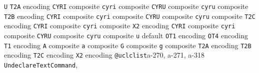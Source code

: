 \documentclass[twoside]{ltxdoc}
\makeatletter
\renewenvironment{theindex}{%
   \@restonecoltrue
   \if@twocolumn\@restonecolfalse\fi
   \columnseprule \z@
   \columnsep 35\p@
   \twocolumn[\index@prologue]%
   \IndexParms
   \let\item\@idxitem
   \ignorespaces
}{\if@restonecol\onecolumn\else\clearpage\fi}
\makeatother
\begin{document}
\begin{theindex}
  \item \texttt  {U}\efill 
    \subitem \texttt  {T2A} encoding\pfill {}
      \subsubitem \texttt  {CYRI} composite\pfill 
      \subsubitem \texttt  {cyri} composite\pfill 
      \subsubitem \texttt  {CYRU} composite\pfill 
      \subsubitem \texttt  {cyru} composite\pfill 
    \subitem \texttt  {T2B} encoding\pfill {}
      \subsubitem \texttt  {CYRI} composite\pfill 
      \subsubitem \texttt  {cyri} composite\pfill 
      \subsubitem \texttt  {CYRU} composite\pfill 
      \subsubitem \texttt  {cyru} composite\pfill 
    \subitem \texttt  {T2C} encoding\pfill {}
      \subsubitem \texttt  {CYRI} composite\pfill 
      \subsubitem \texttt  {cyri} composite\pfill 
    \subitem \texttt  {X2} encoding\pfill {}
      \subsubitem \texttt  {CYRI} composite\pfill 
      \subsubitem \texttt  {cyri} composite\pfill 
      \subsubitem \texttt  {CYRU} composite\pfill 
      \subsubitem \texttt  {cyru} composite\pfill 
  \item \texttt  {u}\efill 
    \subitem default\pfill {}
    \subitem \texttt  {OT1} encoding\pfill {}
    \subitem \texttt  {OT4} encoding\pfill {}
    \subitem \texttt  {T1} encoding\pfill {}
      \subsubitem \texttt  {A} composite\pfill {}
      \subsubitem \texttt  {a} composite\pfill {}
      \subsubitem \texttt  {G} composite\pfill {}
      \subsubitem \texttt  {g} composite\pfill {}
    \subitem \texttt  {T2A} encoding\pfill {}
    \subitem \texttt  {T2B} encoding\pfill {}
    \subitem \texttt  {T2C} encoding\pfill {}
    \subitem \texttt  {X2} encoding\pfill {}
  \item \texttt  {@uclclist}\pfill a-270, a-271, a-318
  \item \texttt  {UndeclareTextCommand}\pfill {}, 

\end{theindex}
\end{document}
